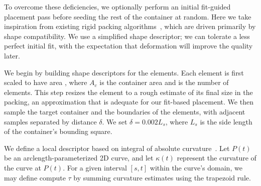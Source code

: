 To overcome these deficiencies, we optionally perform an initial fit-guided
placement pass before seeding the rest of the container at random. 
Here we take inspiration from existing rigid packing 
algorithms~\cite{Kwan2016}, which are driven primarily by shape 
compatibility.  We use a simplified shape descriptor; we can tolerate
a less perfect initial fit, with the expectation that deformation will
improve the quality later.

We begin by building shape descriptors for the elements.  
Each element is first scaled to have area
, where $A_c$ is the container area and  is the 
number of elements.  This step resizes the element to a rough estimate
of its final size in the packing, an approximation that is adequate
for our fit-based placement.  We then sample the target container and
the boundaries of the elements, with adjacent samples separated by
distance $\delta$.  We set $\delta=0.002L_s$, where $L_s$ is the
side length of the container's bounding square.

We define a local descriptor based on integral of absolute curvature~\cite{Cui2009,Kwan2016}.
Let $P(t)$ be an arclength-parameterized 2D curve, and let $\kappa(t)$ represent the curvature of the curve at $P(t)$.  For a given interval $[s,t]$ within the curve's domain, we may define 
 compute $\tau$ by summing curvature estimates using the trapezoid rule.

